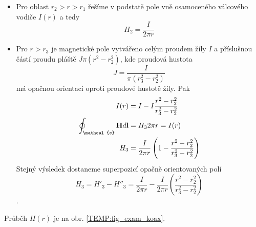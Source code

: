 \begin{example}
\begin{itemize}
    \item Pro oblast $r_2>r>r_1$ řešíme v podstatě pole vně osamoceného válcového vodiče
          $I(r)$ a tedy $$H_2 = \frac{I}{2\pi r}$$
    \item Pro $r>r_3$ je magnetické pole vytvářeno celým proudem žíly $I$ a příslušnou částí
          proudu pláště $J\pi(r^2 - r_2^2)$, kde proudová hustota $$J =
          \frac{I}{\pi(r_3^2-r_2^2)}$$ má opačnou orientaci oproti proudové hustotě žíly. Pak 
          \begin{align*}
            I(r)                           &= I - I\frac{r^2-r_2^2}{r_3^2-r_2^2} \\
            \oint_{\mathcal{c}}\vr{H}d\vr{l} &= H_32\pi r = I(r)                   \\          
            H_3                            &= \frac{I}{2\pi r}\left(1 - 
            \frac{r^2 - r_2^2}{r_3^2 - r_2^2}\right) 
          \end{align*}
          Stejný výsledek dostaneme superpozicí opačně orientovaných polí $$H_3 = H'_3 - H''_3 =
          \frac{I}{2\pi r} - \frac{I}{2\pi r}\left(\frac{r^2 - r_2^2}{r_3^2 - r_2^2}\right)$$. 
  \end{itemize}
  Průběh $H(r)$ je na obr. \ref{TEMP:fig_exam_koax}.
\end{example}
